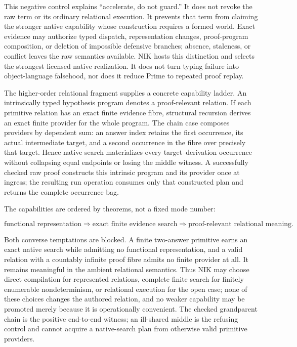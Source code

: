 \documentclass[11pt]{article}
\begin{document}
This negative control explains ``accelerate, do not guard.''  It does not revoke
the raw term or its ordinary relational execution.  It prevents that term from
claiming the stronger native capability whose construction requires a formed
world.  Exact evidence may authorize typed dispatch, representation changes,
proof-program composition, or deletion of impossible defensive branches;
absence, staleness, or conflict leaves the raw semantics available.  NIK hosts
this distinction and selects the strongest licensed native realization.  It does
not turn typing failure into object-language falsehood, nor does it reduce Prime
to repeated proof replay.

The higher-order relational fragment supplies a concrete capability ladder.
An intrinsically typed hypothesis program denotes a proof-relevant relation.
If each primitive relation has an exact finite evidence fibre, structural
recursion derives an exact finite provider for the whole program.  The chain
case composes providers by dependent sum: an answer index retains the first
occurrence, its actual intermediate target, and a second occurrence in the
fibre over precisely that target.  Hence native search materializes every
target--derivation occurrence without collapsing equal endpoints or losing the
middle witness.  A successfully checked raw proof constructs this intrinsic
program and its provider once at ingress; the resulting run operation consumes
only that constructed plan and returns the complete occurrence bag.

The capabilities are ordered by theorems, not a fixed mode number:

\[
  \text{functional representation}
    \Longrightarrow \text{exact finite evidence search}
    \Longrightarrow \text{proof-relevant relational meaning}.
\]

Both converse temptations are blocked.  A finite two-answer primitive earns an
exact native search while admitting no functional representation, and a valid
relation with a countably infinite proof fibre admits no finite provider at all.
It remains meaningful in the ambient relational semantics.  Thus NIK may choose
direct compilation for represented relations, complete finite search for
finitely enumerable nondeterminism, or relational execution for the open case;
none of these choices changes the authored relation, and no weaker capability
may be promoted merely because it is operationally convenient.  The checked
grandparent chain is the positive end-to-end witness; an ill-shared middle is
the refusing control and cannot acquire a native-search plan from otherwise
valid primitive providers.
\end{document}
